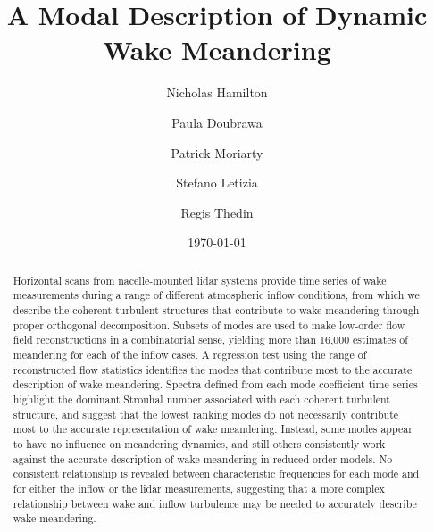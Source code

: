 \documentclass[%
 aip,
 amsmath,
 amssymb,
]{revtex4-2}
\begin{document}

\title{A Modal Description of Dynamic Wake Meandering}%

\author{Nicholas Hamilton}
\author{Paula Doubrawa}
\author{Patrick Moriarty}
\author{Stefano Letizia}
\author{Regis Thedin}

\date{\today}%

\begin{abstract}
Horizontal scans from nacelle-mounted lidar systems provide time series of wake measurements during a range of different atmospheric inflow conditions, from which we describe the coherent turbulent structures that contribute to wake meandering through proper orthogonal decomposition. 
Subsets of modes are used to make low-order flow field reconstructions in a combinatorial sense, yielding more than 16,000 estimates of meandering for each of the inflow cases.
A regression test using the range of reconstructed flow statistics identifies the modes that contribute most to the accurate description of wake meandering.
Spectra defined from each mode coefficient time series highlight the dominant Strouhal number associated with each coherent turbulent structure, and suggest that the lowest ranking modes do not necessarily contribute most to the accurate representation of wake meandering. 
Instead, some modes appear to have no influence on meandering dynamics, and still others consistently work against the accurate description of wake meandering in reduced-order models.
No consistent relationship is revealed between characteristic frequencies for each mode and for either the inflow or the lidar measurements, suggesting that a more complex relationship between wake and inflow turbulence may be needed to accurately describe wake meandering.


\end{abstract}

\maketitle
\end{document}
